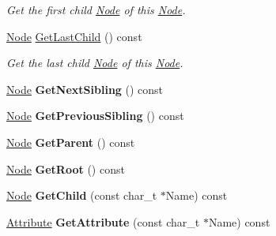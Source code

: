 \begin{DoxyCompactItemize}
\begin{DoxyCompactList}\small\item\em Get the first child \hyperlink{classphys_1_1xml_1_1Node}{Node} of this \hyperlink{classphys_1_1xml_1_1Node}{Node}. \item\end{DoxyCompactList}\item 
\hyperlink{classphys_1_1xml_1_1Node}{Node} \hyperlink{classphys_1_1xml_1_1Node_a10f1a568c8c2c691126f1a9ed2afb922}{GetLastChild} () const 
\begin{DoxyCompactList}\small\item\em Get the last child \hyperlink{classphys_1_1xml_1_1Node}{Node} of this \hyperlink{classphys_1_1xml_1_1Node}{Node}. \item\end{DoxyCompactList}\item 
\hypertarget{classphys_1_1xml_1_1Node_ae8e16e5872ead5d66b6c8605c2f79a77}{
\hyperlink{classphys_1_1xml_1_1Node}{Node} {\bfseries GetNextSibling} () const }
\label{d7/d0a/classphys_1_1xml_1_1Node_ae8e16e5872ead5d66b6c8605c2f79a77}

\item 
\hypertarget{classphys_1_1xml_1_1Node_aef027853db1468edcebb6dbdef6031a3}{
\hyperlink{classphys_1_1xml_1_1Node}{Node} {\bfseries GetPreviousSibling} () const }
\label{d7/d0a/classphys_1_1xml_1_1Node_aef027853db1468edcebb6dbdef6031a3}

\item 
\hypertarget{classphys_1_1xml_1_1Node_ac1e4cabed86afe2c340176e7d50ca46f}{
\hyperlink{classphys_1_1xml_1_1Node}{Node} {\bfseries GetParent} () const }
\label{d7/d0a/classphys_1_1xml_1_1Node_ac1e4cabed86afe2c340176e7d50ca46f}

\item 
\hypertarget{classphys_1_1xml_1_1Node_a992a08ffc854e5e7f7bbfc5ecb3efd27}{
\hyperlink{classphys_1_1xml_1_1Node}{Node} {\bfseries GetRoot} () const }
\label{d7/d0a/classphys_1_1xml_1_1Node_a992a08ffc854e5e7f7bbfc5ecb3efd27}

\item 
\hypertarget{classphys_1_1xml_1_1Node_ab01b2b7b9d38fb778a43b82c3aaf4cb0}{
\hyperlink{classphys_1_1xml_1_1Node}{Node} {\bfseries GetChild} (const char\_\-t $\ast$Name) const }
\label{d7/d0a/classphys_1_1xml_1_1Node_ab01b2b7b9d38fb778a43b82c3aaf4cb0}

\item 
\hypertarget{classphys_1_1xml_1_1Node_a64aba640a2bdfacd6835bc71de1e23bc}{
\hyperlink{classphys_1_1xml_1_1Attribute}{Attribute} {\bfseries GetAttribute} (const char\_\-t $\ast$Name) const }
\label{d7/d0a/classphys_1_1xml_1_1Node_a64aba640a2bdfacd6835bc71de1e23bc}


\end{DoxyCompactItemize}
